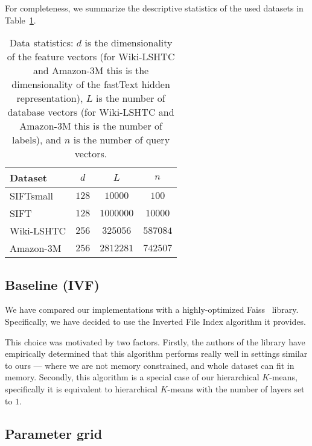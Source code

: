         For completeness, we summarize the descriptive statistics of the used datasets in Table~\ref{tab:dsz}.

        \begin{table}
          \caption{Data statistics: $d$ is the dimensionality of the feature vectors (for Wiki-LSHTC and Amazon-3M this
          is the dimensionality of the fastText hidden representation), $L$ is the number
          of database vectors (for Wiki-LSHTC and Amazon-3M this is the number of labels), and $n$ is the number of query vectors.}
          \label{tab:dsz}
          \centering
          {
          \begin{tabular}{l|c|c|c|}
            Dataset & $d$ &$L$& $n$ \\
            \hline
            SIFTsmall   & $128$ & $10000$   & $100$    \\
            SIFT        & $128$ & $1000000$ & $10000$  \\
            Wiki-LSHTC  & $256$ & $325056$  & $587084$ \\
            Amazon-3M   & $256$ & $2812281$ & $742507$ \\
          \end{tabular}
          }
        \end{table}

    \subsection{Baseline (IVF)}\label{subsec:baselineivf}

        We have compared our implementations with a highly-optimized Faiss~\cite{faiss} library.
        Specifically, we have decided to use the Inverted File Index algorithm it provides.

        This choice was motivated by two factors.
        Firstly, the authors of the library have empirically determined that this algorithm performs
        really well in settings similar to ours --- where we are not memory constrained, and whole dataset
        can fit in memory.
        Secondly, this algorithm is a special case of our hierarchical $K$-means, specifically
        it is equivalent to hierarchical $K$-means with the number of layers set to $1$.

    \subsection{Parameter grid}\label{subsec:parameterGrid}

